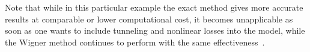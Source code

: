Note that while in this particular example the exact method gives more accurate results at comparable or lower computational cost, it becomes unapplicable as soon as one wants to include tunneling and nonlinear losses into the model, while the Wigner method continues to perform with the same effectiveness~\cite{Opanchuk2012a}.
